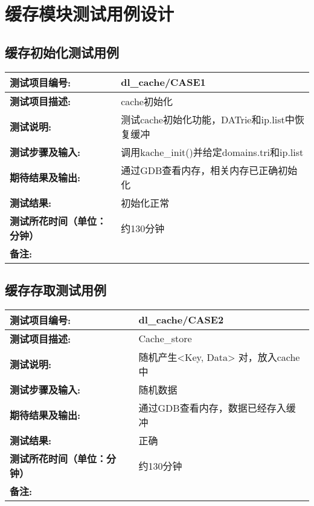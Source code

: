 %
%
\section{缓存模块测试用例设计}
\subsection{缓存初始化测试用例}

\begin{table}[H]
\centering
\begin{tabular}{|p{8em}|p{22em}|}
\hline
\textbf{测试项目编号:}&dl\_cache/CASE1\\
\hline
\textbf{测试项目描述:}&cache初始化\\
\hline
\textbf{测试说明:}& 测试cache初始化功能，DATrie和ip.list中恢复缓冲\\
\hline
\textbf{测试步骤及输入:}&调用kache\_init()并给定domains.tri和ip.list\\
\hline
\textbf{期待结果及输出:}&通过GDB查看内存，相关内存已正确初始化\\
\hline
\textbf{测试结果:}& 初始化正常\\
\hline
\textbf{测试所花时间（单位：分钟）}& 约130分钟\\
\hline
\textbf{备注:}& \\
\hline
\end{tabular}
\end{table}

\subsection {缓存存取测试用例}
\begin{table}[H]
\centering
\begin{tabular}{|p{8em}|p{22em}|}
\hline
\textbf{测试项目编号:}&dl\_cache/CASE2\\
\hline
\textbf{测试项目描述:}&Cache\_store\\
\hline
\textbf{测试说明:}&随机产生<Key, Data> 对，放入cache中\\
\hline
\textbf{测试步骤及输入:}& 随机数据\\
\hline
\textbf{期待结果及输出:}&通过GDB查看内存，数据已经存入缓冲\\
\hline
\textbf{测试结果:}&正确\\
\hline
\textbf{测试所花时间（单位：分钟）}& 约130分钟\\
\hline
\textbf{备注:}& \\
\hline
\end{tabular}
\end{table}

